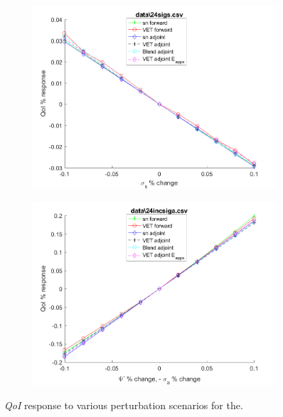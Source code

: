 \documentclass[12pt]{report}
\newcommand{\qoi}{{\it QoI}\xspace}
\begin{document}
\begin{figure}[H]
\begin{subfigure}{.5\textwidth}
  \includegraphics[width=.98\linewidth]{figures2/24sigsSens.png}
  \label{T3:sfig3}
\end{subfigure}%
\begin{subfigure}{.5\textwidth}
  \centering
  \includegraphics[width=.98\linewidth]{figures2/24incsigaSens.png}
  \label{T3:sfig4}
\end{subfigure}
\caption{\qoi response to various perturbation scenarios for the.}
\end{figure}
\end{document}
